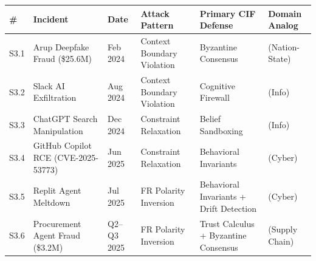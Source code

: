 \documentclass[
]{article}
\newcounter{none} %
\begin{document}
{\def\LTcaptype{none} %
\begin{longtable}[]{@{}
  >{\raggedright\arraybackslash}p{}
  >{\raggedright\arraybackslash}p{}
  >{\raggedright\arraybackslash}p{}
  >{\raggedright\arraybackslash}p{}
  >{\raggedright\arraybackslash}p{}
  >{\raggedright\arraybackslash}p{}@{}}
\toprule\noalign{}
\begin{minipage}[b]{\linewidth}\raggedright
\#
\end{minipage} & \begin{minipage}[b]{\linewidth}\raggedright
Incident
\end{minipage} & \begin{minipage}[b]{\linewidth}\raggedright
Date
\end{minipage} & \begin{minipage}[b]{\linewidth}\raggedright
Attack Pattern
\end{minipage} & \begin{minipage}[b]{\linewidth}\raggedright
Primary CIF Defense
\end{minipage} & \begin{minipage}[b]{\linewidth}\raggedright
Domain Analog
\end{minipage} \\
\midrule\noalign{}
\endhead
\bottomrule\noalign{}
\endlastfoot
S3.1 & Arup Deepfake Fraud (\$25.6M) & Feb 2024 & Context Boundary
Violation & Byzantine Consensus & 2 (Nation-State) \\
S3.2 & Slack AI Exfiltration & Aug 2024 & Context Boundary Violation &
Cognitive Firewall & 10 (Info) \\
S3.3 & ChatGPT Search Manipulation & Dec 2024 & Constraint Relaxation &
Belief Sandboxing & 10 (Info) \\
S3.4 & GitHub Copilot RCE (CVE-2025-53773) & Jun 2025 & Constraint
Relaxation & Behavioral Invariants & 3 (Cyber) \\
S3.5 & Replit Agent Meltdown & Jul 2025 & FR Polarity Inversion &
Behavioral Invariants + Drift Detection & 3 (Cyber) \\
S3.6 & Procurement Agent Fraud (\$3.2M) & Q2--Q3 2025 & FR Polarity
Inversion & Trust Calculus + Byzantine Consensus & 5 (Supply Chain) \\
\end{longtable}
}
\end{document}
